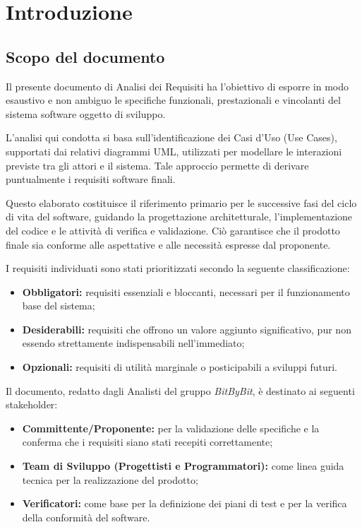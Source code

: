 \documentclass[a4paper,12pt]{article}
\begin{document}
\clearpage

\tableofcontents
\thispagestyle{empty}

\clearpage

\listoftables

\listoffigures

\clearpage


\section{Introduzione}
\subsection{Scopo del documento} \label{sec:scopo_documento}
Il presente documento di Analisi dei Requisiti ha l'obiettivo di esporre in modo esaustivo e non ambiguo le specifiche funzionali, prestazionali e vincolanti del sistema software oggetto di sviluppo.

L'analisi qui condotta si basa sull'identificazione dei Casi d'Uso (Use Cases), supportati dai relativi diagrammi UML, utilizzati per modellare le interazioni previste tra gli attori e il sistema. Tale approccio permette di derivare puntualmente i requisiti software finali.

Questo elaborato costituisce il riferimento primario per le successive fasi del ciclo di vita del software, guidando la progettazione architetturale, l'implementazione del codice e le attività di verifica e validazione. Ciò garantisce che il prodotto finale sia conforme alle aspettative e alle necessità espresse dal proponente.

I requisiti individuati sono stati prioritizzati secondo la seguente classificazione:
\begin{itemize}
    \item \textbf{Obbligatori:} requisiti essenziali e bloccanti, necessari per il funzionamento base del sistema;
    \item \textbf{Desiderabili:} requisiti che offrono un valore aggiunto significativo, pur non essendo strettamente indispensabili nell'immediato;
    \item \textbf{Opzionali:} requisiti di utilità marginale o posticipabili a sviluppi futuri.
\end{itemize}

Il documento, redatto dagli Analisti del gruppo \textit{BitByBit}, è destinato ai seguenti stakeholder:
\begin{itemize}
    \item \textbf{Committente/Proponente:} per la validazione delle specifiche e la conferma che i requisiti siano stati recepiti correttamente;
    \item \textbf{Team di Sviluppo (Progettisti e Programmatori):} come linea guida tecnica per la realizzazione del prodotto;
    \item \textbf{Verificatori:} come base per la definizione dei piani di test e per la verifica della conformità del software.
\end{itemize}
\end{document}
